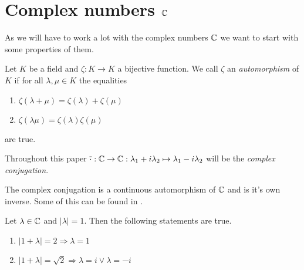 \section{Complex numbers $\mathbb{C}$}

As we will have to work a lot with the complex numbers $\mathbb{C}$ we want to start with some properties of them. 

\begin{definition}
	Let $K$ be a field and $\zeta: K \to K$ a bijective function. We call $\zeta$ an \textit{automorphism} of $K$ if for all $\lambda, \mu \in K$ the equalities
	\begin{enumerate}
		\item $\zeta(\lambda + \mu) = \zeta(\lambda) + \zeta(\mu)$
		\item $\zeta(\lambda \mu) = \zeta(\lambda) \zeta(\mu)$
	\end{enumerate}
	are true.
	
\end{definition}

\begin{definition}
	Throughout this paper $\overline{\cdot}: \mathbb{C} \to \mathbb{C}: \lambda_1 + i \lambda_2 \mapsto \lambda_1 - i \lambda_2$ will be the \textit{complex conjugation}.
\end{definition}

\begin{remark}
	The complex conjugation is a continuous automorphism of $\mathbb{C}$ and is it's own inverse. Some of this can be found in \cite[p.40]{LinAG1&2}.
\end{remark}

\begin{lemma} \label{lemma:complex_geom}
	Let $\lambda \in \mathbb{C}$ and $|\lambda| = 1$. Then the following statements are true.
	\begin{enumerate}
		\item $|1 + \lambda| = 2 \Rightarrow \lambda = 1$
		\item $|1 + \lambda| = \sqrt{2} \Rightarrow \lambda = i \lor \lambda = -i$
	\end{enumerate}
\end{lemma}

